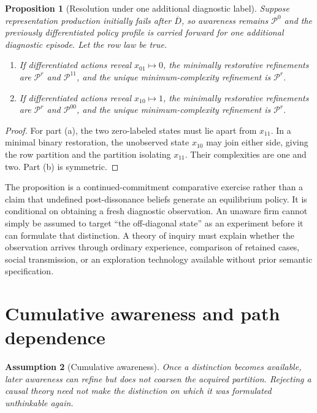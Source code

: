 \documentclass[11pt]{article}
\newtheorem{assumption}{Assumption}[section]
\newtheorem{proposition}[assumption]{Proposition}
\newcommand{\Prow}{\mathcal P^{r}}
\begin{document}
\begin{proposition}[Resolution under one additional diagnostic label]
\label{prop:directed-resolution}
Suppose representation production initially fails after $\overline D$, so
awareness remains $\mathcal P^0$ and the previously differentiated policy
profile is carried forward for one additional diagnostic episode.  Let the row
law be true.
\begin{enumerate}[label=(\alph*)]
  \item If differentiated actions reveal $x_{01}\mapsto0$, the minimally
  restorative refinements are $\Prow$ and $\mathcal P^{11}$, and the unique
  minimum-complexity refinement is $\Prow$.
  \item If differentiated actions reveal $x_{10}\mapsto1$, the minimally
  restorative refinements are $\Prow$ and $\mathcal P^{00}$, and the unique
  minimum-complexity refinement is $\Prow$.
\end{enumerate}
\end{proposition}

\begin{proof}
For part (a), the two zero-labeled states must lie apart from $x_{11}$.  In a
minimal binary restoration, the unobserved state $x_{10}$ may join either side,
giving the row partition and the partition isolating $x_{11}$.  Their
complexities are one and two.  Part (b) is symmetric.
\end{proof}

The proposition is a continued-commitment comparative exercise rather than a
claim that undefined post-dissonance beliefs generate an equilibrium policy.
It is conditional on obtaining a fresh diagnostic observation.  An
unaware firm cannot simply be assumed to target ``the off-diagonal state'' as
an experiment before it can formulate that distinction.  A theory of inquiry
must explain whether the observation arrives through ordinary experience,
comparison of retained cases, social transmission, or an exploration
technology available without prior semantic specification.

\section{Cumulative awareness and path dependence}

\begin{assumption}[Cumulative awareness]
\label{ass:cumulative-awareness}
Once a distinction becomes available, later awareness can refine but does not
coarsen the acquired partition.  Rejecting a causal theory need not make the
distinction on which it was formulated unthinkable again.
\end{assumption}
\end{document}
